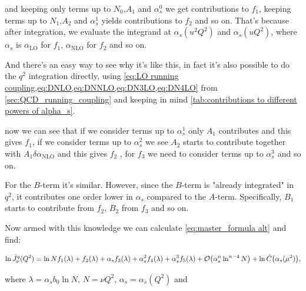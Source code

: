 \documentclass[../Tesi_Jiahao_Miao_986136.tex]{subfiles}
\begin{document}
and keeping only terms up to $N_0$,$A_1$ and $\alpha_s^0$ we get contributions to $f_1$, keeping terms up to $N_1$,$A_2$ and $\alpha_s^1$ yields contributions to $f_2$ and so on. 
That's because after integration, we evaluate the integrand at $\alpha_s(u^2 Q^2)$ and $\alpha_s(u Q^2)$, where $\alpha_s$ is $\alpha_{\text{LO}}$ for $f_1$, $\alpha_{\text{NLO}}$ for $f_2$ and so on. 

And there's an easy way to see why it's like this, in fact it's also possible to do the $q^2$ integration directly, using \cref{eq:LO running coupling,eq:DNLO,eq:DNNLO,eq:DN3LO,eq:DN4LO} from \cref{sec:QCD_running_coupling}
and keeping in mind \cref{tab:contributions to different powers of alpha_s}.


now we can see that if we consider terms up to $\alpha_s^1$ only $A_1$ contributes and this gives $f_1$, if we consider terms up to $\alpha_s^2$ we see $A_2$ starts to contribute together with $A_1  \delta\alpha_{\text{NLO}}$
and this gives $f_2$ , for $f_3$ we need to consider terms up to $\alpha_s^3$ and so on. 

For the $B$-term it's similar. However, since the $B$-term is "already integrated" in $q^2$, it contributes one order lower in $\alpha_s$ compared to the $A$-term. Specifically, $B_1$ starts to contribute from $f_2$, $B_2$ from $f_3$ and so on.  

Now armed with this knowledge we can calculate \cref{eq:master_formula alt} and find: 

\begingroup
\allowdisplaybreaks
\begin{equation}
    \ln \Tilde{J}_\nu^q(Q^2) = \ln N f_1(\lambda) + f_2(\lambda) + \alpha_s f_3(\lambda) + \alpha_s^2 f_4(\lambda) + \alpha_s^3 f_5(\lambda) + \order{\alpha_s^n \ln^{n-4}N} + \ln \Tilde{C}\qty(\alpha_s(\mu^2)),
\end{equation}

where $\lambda = \alpha_s b_0 \ln N$, $N=\nu Q^2$, $\alpha_s = \alpha_s(Q^2)$ and

\end{document}
